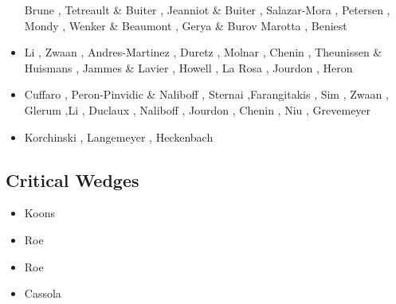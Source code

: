 \begin{scriptsize}
\begin{itemize}
                      Brune \cite{brun18}, Tetreault \& Buiter \cite{tebu18},
                      Jeanniot \& Buiter \cite{jebu18}, Salazar-Mora \etal \cite{sahf18},
                      Petersen \etal \cite{pesn18}, Mondy \etal \cite{mord18},
                      Wenker \& Beaumont \cite{webe18,webe18b},
                      Gerya \& Burov \cite{gebu18} Marotta \etal \cite{marc18},
                      Beniest \etal \cite{bews18} 
\item[\twothousandnineteen] Li \etal \cite{lisp19}, Zwaan \etal \cite{zwsb19}, 
                      Andres-Martinez \etal \cite{anpa19}, Duretz \etal \cite{dual19},
                      Molnar \etal \cite{mocb19}, Chenin \etal \cite{chmd19},
                      Theunissen \& Huismans \cite{thhu19}, Jammes \& Lavier \cite{jala19},
                      Howell \etal \cite{hooi19}, La Rosa \etal \cite{lapk19}, 
                      Jourdon \etal \cite{jolm19}, Heron \etal \cite{hepm19}
\item[\twothousandtwenty] Cuffaro \etal \cite{cump20}, Peron-Pinvidic \& Naliboff \cite{pena20}, 
                          Sternai \cite{ster20},Farangitakis \etal \cite{fahm20}, Sim \etal \cite{siss20}, 
                          Zwaan \etal \cite{zwsr20}, Glerum \etal \cite{glbs20},Li \etal \cite{lial20}, 
                          Duclaux \etal \cite{duhm20}, Naliboff \etal \cite{nagb20}, 
                          Jourdon \etal \cite{jolm20}, Chenin \etal \cite{chsm20}, 
                          Niu \cite{niu20}, Grevemeyer \etal \cite{grrm21}
\item[\twothousandtwentyone] Korchinski \etal \cite{kotr21}, Langemeyer \etal \cite{lalt21},
                             Heckenbach \etal \cite{hebg21}
\end{itemize}
\end{scriptsize}

\subsection{Critical Wedges}

\begin{scriptsize}
\begin{itemize}
\item[\nineteenninetyfour] Koons \cite{koon94}
\item[\twothousandsix] Roe \etal \cite{rosw06}
\item[\twothousandeight] Roe \etal \cite{rowf08}
\item[\twothousandthirteen] Cassola \cite{cass13}
\end{itemize}
\end{scriptsize}


